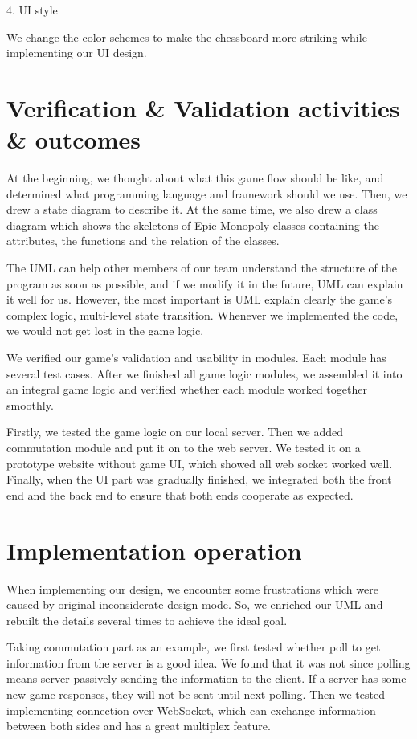 \documentclass[a4paper,11pt]{article}
\begin{document}
4.	UI style

    We change the color schemes to make the chessboard more striking while implementing our UI design.

\section{Verification \& Validation activities \& outcomes}
At the beginning, we thought about what this game flow should be like, and determined what programming language and framework should we use. Then, we drew a state diagram to describe it. At the same time, we also drew a class diagram which shows the skeletons of Epic-Monopoly classes containing the attributes, the functions and the relation of the classes.

The UML can help other members of our team understand the structure of the program as soon as possible, and if we modify it in the future, UML can explain it well for us. However, the most important is UML explain clearly the game's complex logic, multi-level state transition. Whenever we implemented the code, we would not get lost in the game logic.

We verified our game's validation and usability in modules. Each module has several test cases. After we finished all game logic modules, we assembled it into an integral game logic and verified whether each module worked together smoothly.

Firstly, we tested the game logic on our local server. Then we added commutation module and put it on to the web server. We tested it on a prototype website without game UI, which showed all web socket worked well. Finally, when the UI part was gradually finished, we integrated both the front end and the back end to ensure that both ends cooperate as expected.

\section{Implementation operation}
When implementing our design, we encounter some frustrations which were caused by original inconsiderate design mode. So, we enriched our UML and rebuilt the details several times to achieve the ideal goal.

Taking commutation part as an example, we first tested whether poll to get information from the server is a good idea. We found that it was not since polling means server passively sending the information to the client. If a server has some new game responses, they will not be sent until next polling. Then we tested implementing connection over WebSocket, which can exchange information between both sides and has a great multiplex feature.
\end{document}
